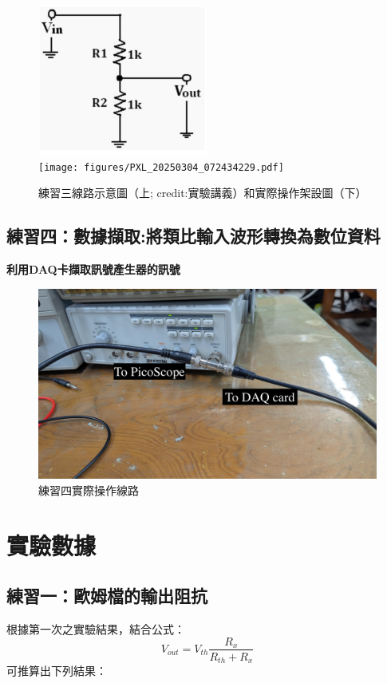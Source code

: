 \documentclass[12pt,a4paper]{article}
\begin{document}
\begin{CJK}{UTF8}{bkai}
\begin{figure}[h]
    \centering
    \includegraphics[width=0.3\linewidth]{figures/exp_3.png}\\
    \texttt{[image: figures/PXL\_20250304\_072434229.pdf]}
    \caption{練習三線路示意圖（上; credit:實驗講義）和實際操作架設圖（下）}
    \label{fig:exp_3}
\end{figure}


\subsection{練習四：數據擷取:將類比輸入波形轉換為數位資料}\label{subsec:step_4}
\hfill

\textbf{利用DAQ卡擷取訊號產生器的訊號}

\begin{figure}[h]
    \centering
    \includegraphics[width=0.5\linewidth]{figures/exp_4.jpg}
    \caption{練習四實際操作線路}
    \label{fig:exp_4}
\end{figure}


\clearpage
\section{實驗數據}

\subsection{練習一：歐姆檔的輸出阻抗}
\hfill

根據第一次之實驗結果，結合公式：
\begin{equation}
\label{eq:va_rout}
    V_{out} = V_{th} \frac{R_{x}}{R_{th}+R_{x}}
\end{equation}
可推算出下列結果：


\end{CJK}
\end{document}
